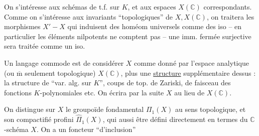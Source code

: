 On s'intéresse aux schémas  de t.f. sur $K$, et aux espaces  $X(\mathbb C)$ correspondants. Comme on s'intéresse aux invariants ``topologiques'' de $X,X(\mathbb C)$, on traitera les morphismes $X'-X$ qui induisent des homéom universels comme des iso -- en particulier les éléments nilpotents ne comptent pas -- une imm. fermée surjective sera traitée comme un iso.

Un langage commode est de considérer $X$ comme donné par l'espace analytique (ou $\overline{\mathrm m}$ seulement topologique) $X(\mathbb C)$, plus une \uline{structure} supplémentaire dessus : la structure de ``var. alg. sur $K$'',  coups de top. de Zariski, de faisceau des fonctions $K$-polynomiales etc. On écrira par la suite $X$ au lieu de $X(\mathbb C)$.

On distingue sur $X$ le groupoïde fondamental $\Pi_1(X)$ au sens topologique, et son compactifié profini $\widehat\Pi_1(X)$, qui   aussi être défini directement en termes du $\mathbb C$-schéma $X$. On a un foncteur ``d'inclusion''


